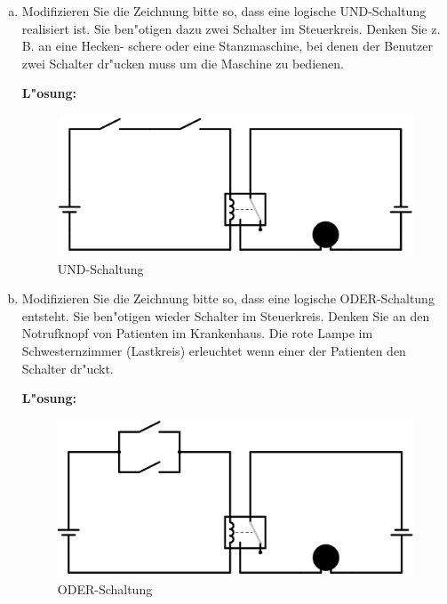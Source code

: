 \documentclass[10pt, a4paper, oneside]{article}
\begin{document}
\pagebreak

\begin{enumerate}[(a)]
    \item Modifizieren Sie die Zeichnung bitte so, dass eine logische
        UND-Schaltung realisiert ist. Sie ben"otigen dazu zwei Schalter im
        Steuerkreis. Denken Sie z. B. an eine Hecken- schere oder eine
        Stanzmaschine, bei denen der Benutzer zwei Schalter dr"ucken muss um die
        Maschine zu bedienen.

        \textbf{L"osung:}

        \begin{figure}[h]
            \includegraphics[width=1\textwidth]{./assets/und-circuit.png}
            \caption{UND-Schaltung}
        \end{figure}

    \item Modifizieren Sie die Zeichnung bitte so, dass eine logische ODER-Schaltung entsteht.
        Sie ben"otigen wieder Schalter im Steuerkreis. Denken Sie an den Notrufknopf
        von Patienten im Krankenhaus. Die rote Lampe im Schwesternzimmer
        (Lastkreis) erleuchtet wenn einer der Patienten den Schalter dr"uckt.

        \textbf{L"osung:}

        \begin{figure}[h]
            \includegraphics[width=1\textwidth]{./assets/oder-circuit.png}
            \caption{ODER-Schaltung}
        \end{figure}


\end{enumerate}
\end{document}
